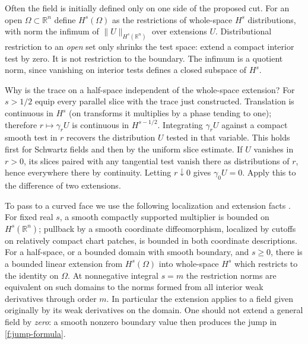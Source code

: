 Often the field is initially defined only on one side of the proposed cut. For an open $\Omega\subset\mathbb R^n$ define $H^s(\Omega)$ as the restrictions of whole-space $H^s$ distributions, with norm the infimum of $\|U\|_{H^s(\mathbb R^n)}$ over extensions $U$. Distributional restriction to an \emph{open} set only shrinks the test space: extend a compact interior test by zero. It is not restriction to the boundary. The infimum is a quotient norm, since vanishing on interior tests defines a closed subspace of $H^s$.

Why is the trace on a half-space independent of the whole-space extension? For $s>1/2$ equip every parallel slice with the trace just constructed. Translation is continuous in $H^s$ (on transforms it multiplies by a phase tending to one); therefore $r\mapsto\gamma_r U$ is continuous in $H^{s-1/2}$. Integrating $\gamma_r U$ against a compact smooth test in $r$ recovers the distribution $U$ tested in that variable. This holds first for Schwartz fields and then by the uniform slice estimate. If $U$ vanishes in $r>0$, its slices paired with any tangential test vanish there as distributions of $r$, hence everywhere there by continuity. Letting $r\downarrow0$ gives $\gamma_0 U=0$. Apply this to the difference of two extensions.

To pass to a curved face we use the following localization and extension facts \cite[Ch.~4, \S\S1--4]{Taylor}. For fixed real $s$, a smooth compactly supported multiplier is bounded on $H^s(\mathbb R^n)$; pullback by a smooth coordinate diffeomorphism, localized by cutoffs on relatively compact chart patches, is bounded in both coordinate descriptions. For a half-space, or a bounded domain with smooth boundary, and $s\geq0$, there is a bounded linear extension from $H^s(\Omega)$ into whole-space $H^s$ which restricts to the identity on $\Omega$. At nonnegative integral $s=m$ the restriction norms are equivalent on such domains to the norms formed from all interior weak derivatives through order $m$. In particular the extension applies to a field given originally by its weak derivatives on the domain. One should not extend a general field by \emph{zero}: a smooth nonzero boundary value then produces the jump in \eqref{f:jump-formula}.

